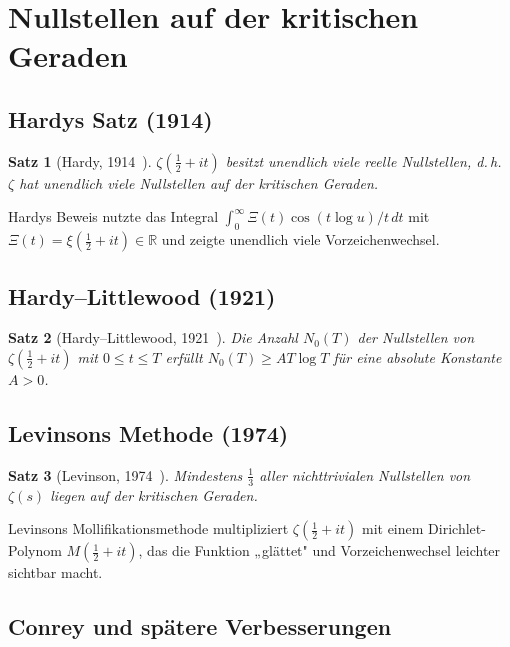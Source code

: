 \documentclass[12pt,a4paper]{article}
\newtheorem{theorem}{Satz}[section]
\theoremstyle{remark}
\begin{document}
\section{Nullstellen auf der kritischen Geraden}

\subsection{Hardys Satz (1914)}

\begin{theorem}[Hardy, 1914~\cite{Hardy1914}]
  $\zeta(\tfrac{1}{2}+it)$ besitzt unendlich viele reelle Nullstellen, d.\,h.\
  $\zeta$ hat unendlich viele Nullstellen auf der kritischen Geraden.
\end{theorem}

Hardys Beweis nutzte das Integral $\int_0^\infty\Xi(t)\cos(t\log u)/t\,dt$ mit
$\Xi(t)=\xi(\tfrac{1}{2}+it)\in\mathbb{R}$ und zeigte unendlich viele Vorzeichenwechsel.

\subsection{Hardy--Littlewood (1921)}

\begin{theorem}[Hardy--Littlewood, 1921~\cite{HardyLittlewood1921}]
  Die Anzahl $N_0(T)$ der Nullstellen von $\zeta(\tfrac{1}{2}+it)$ mit $0\leq t\leq T$
  erfüllt $N_0(T)\geq AT\log T$ für eine absolute Konstante $A>0$.
\end{theorem}

\subsection{Levinsons Methode (1974)}

\begin{theorem}[Levinson, 1974~\cite{Levinson1974}]
  Mindestens $\tfrac{1}{3}$ aller nichttrivialen Nullstellen von $\zeta(s)$ liegen auf der
  kritischen Geraden.
\end{theorem}

Levinsons Mollifikationsmethode multipliziert $\zeta(\tfrac{1}{2}+it)$ mit einem
Dirichlet-Polynom $M(\tfrac{1}{2}+it)$, das die Funktion „glättet" und
Vorzeichenwechsel leichter sichtbar macht.

\subsection{Conrey und spätere Verbesserungen}
\end{document}
